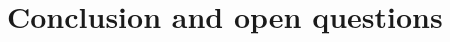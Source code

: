 \documentclass[11pt]{llncs}
\begin{document}
\section{Conclusion and open questions}




\newpage



\ifnum{}


\else


\fi

\end{document}
